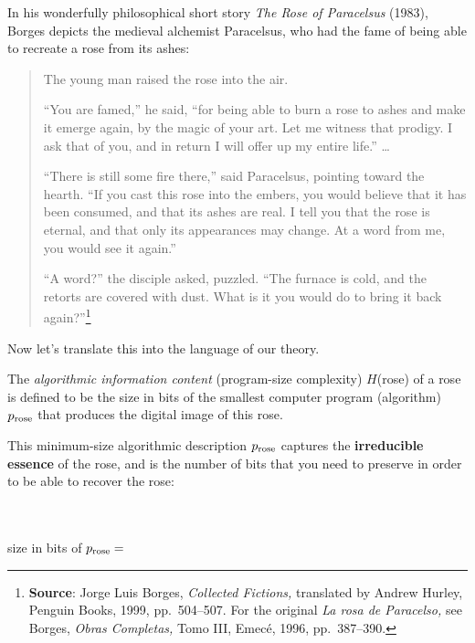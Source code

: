 \documentclass[12pt]{book}
\begin{document}
In his wonderfully philosophical short story 
\emph{The Rose of Paracelsus} (1983), Borges depicts the
medieval alchemist Paracelsus, who had the fame of being able to recreate
a rose from its ashes:
\begin{quotation}
The young man raised the rose into the air.
 
``You are famed,'' he said, ``for being able to burn a rose to ashes
and make it emerge again, by the magic of your art. Let me 
witness that prodigy. I ask that of you, and in return I will offer up
my entire life.''  \ldots
 
``There is still some fire there,'' said Paracelsus, pointing toward 
the hearth. ``If you cast this rose into the embers, you would
believe that it has been consumed, and that its ashes are real. I
tell you that the rose is eternal, and that only its appearances may
change. At a word from me, you would see it again.''
 
``A word?'' the disciple asked, puzzled. ``The furnace is cold, and
the retorts are covered with dust. What is it you would do to bring
it back again?''\footnote
{\textbf{Source}: Jorge Luis Borges, 
\emph{Collected Fictions,} translated by Andrew Hurley,
Penguin Books, 1999, pp.\ 504--507.
For the original \emph{La rosa de Paracelso,}
see Borges, 
\emph{Obras Completas,} Tomo III, Emec\'e, 1996, pp.\ 387--390.}
\end{quotation}
 
Now let's translate this into the language of our theory.
 
The \emph{algorithmic information content} (program-size complexity) $H$(rose) of a rose 
is defined to be
the size in bits of the smallest computer program (algorithm) $p_{\mbox{\scriptsize rose}}$ that 
produces the digital image of this rose.
 
This minimum-size algorithmic description $p_{\mbox{\scriptsize rose}}$ 
captures the \textbf{irreducible essence}
of the rose,
and is the number of bits that you need to preserve in order to be able to recover the rose:

\begin{center}
\vspace{\baselineskip}
\\ 
\vspace{\baselineskip}
\\
size in bits of $p_{\mbox{\scriptsize rose}} =$ 
\vspace{.25\baselineskip}
\\
\end{center}
 
\end{document}
